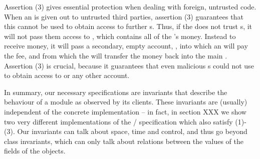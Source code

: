 Assertion (3) gives essential protection when dealing with foreign, untrusted code.
When an  is given out to untrusted third parties, assertion (3) guarantees that
this  cannot be used to obtain access to further  s. 
Thus, if the  does not trust s, it will not pass them access to , which
contains all of the 's money. Instead to receive money, it will pass a secondary, empty account, ,
into which an   will pay the fee, and from which the  will transfer the money
back into the main . Assertion (3) is crucial, because it guarantees that even 
malicious s  could not use   to obtain access to
  or any other account. %


 
\vspace{.1cm} 

In summary, our  necessary specifications are invariants that describe the
behaviour of a module as observed by its clients. 
These invariants are (usually) independent of the concrete implementation --
in fact, in section XXX we show two very different implementations
of the / specification which also satisfy (1)-(3).
Our invariants 
 can talk about space, time and control, and thus go beyond
 class invariants, which can only
talk   about relations between the  values of the fields of the objects.
